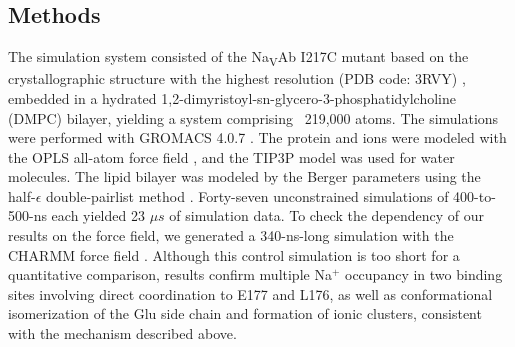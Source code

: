 \begin{refsection}
\section{Methods} 
The simulation system consisted of the Na\textsubscript{V}Ab I217C mutant based on the crystallographic structure with the highest resolution (PDB code: 3RVY) \cite{Payandeh:2012ib}, embedded in a hydrated 1,2-dimyristoyl-sn-glycero-3-phosphatidylcholine (DMPC) bilayer, yielding a system comprising ~219,000 atoms.  The simulations were performed with GROMACS 4.0.7 \cite{Hess:2008db}.  The protein and ions were modeled with the OPLS all-atom force field \cite{Jorgensen:1996vx,Kaminski:2001eq}, and the TIP3P model \cite{Jorgensen:1983ty} was used for water molecules.  The lipid bilayer was modeled by the Berger parameters \cite{Berger:1997bc} using the half-$\epsilon$ double-pairlist method \cite{Chakrabarti:2010gf}.  Forty-seven unconstrained simulations of 400-to-500-ns each yielded 23 $\mu s$ of simulation data.  To check the dependency of our results on the force field, we generated a 340-ns-long simulation with the CHARMM force field \cite{MacKerell:1998tp}. Although this control simulation is too short for a quantitative comparison, results confirm multiple Na$^+$ occupancy in two binding sites involving direct coordination to E177 and L176, as well as conformational isomerization of the Glu side chain and formation of ionic clusters, consistent with the mechanism described above.

\printbibliography[heading=subbibnumbered,title={References}]
 \end{refsection}